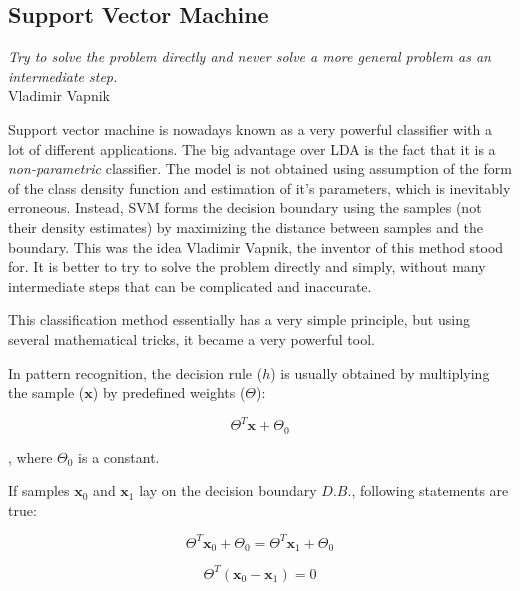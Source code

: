 \documentclass{article}
\begin{document}
\subsection{Support Vector Machine}

\begin{myquote}
\begin{flushright}
\textit{Try to solve the problem directly and never solve a more general problem as an intermediate step.} \\Vladimir Vapnik
\end{flushright}
\end{myquote}


Support vector machine is nowadays known as a very powerful classifier with a lot of different applications. The big advantage over LDA is the fact that it is a \emph{non-parametric} classifier. The model is not obtained using assumption of the form of the class density function and estimation of it's parameters, which is inevitably erroneous. Instead, SVM forms the decision boundary using the samples (not their density estimates) by maximizing the distance between samples and the boundary.
This was the idea Vladimir Vapnik, the inventor of this method stood for. It is better to try to solve the problem directly and simply, without many intermediate steps that can be complicated and inaccurate.

This classification method essentially has a very simple principle, but using several mathematical tricks, it became a very powerful tool. 

In pattern recognition, the decision rule ($h$) is usually obtained by multiplying the sample ($\mathbf{x}$) by predefined weights ($\Theta$):

\begin{equation} 
\Theta^T \mathbf{x} + \Theta_0
\end{equation}

, where $\Theta_0$ is a constant.

If samples $\mathbf{x}_0$ and $\mathbf{x}_1$ lay on the decision boundary $D.B.$, following statements are true:

\begin{equation} 
\Theta^T \mathbf{x}_0 + \Theta_0 = \Theta^T \mathbf{x}_1 + \Theta_0
\end{equation}

\begin{equation} 
\Theta^T (\mathbf{x}_0 - \mathbf{x}_1) = 0
\end{equation}
\end{document}
